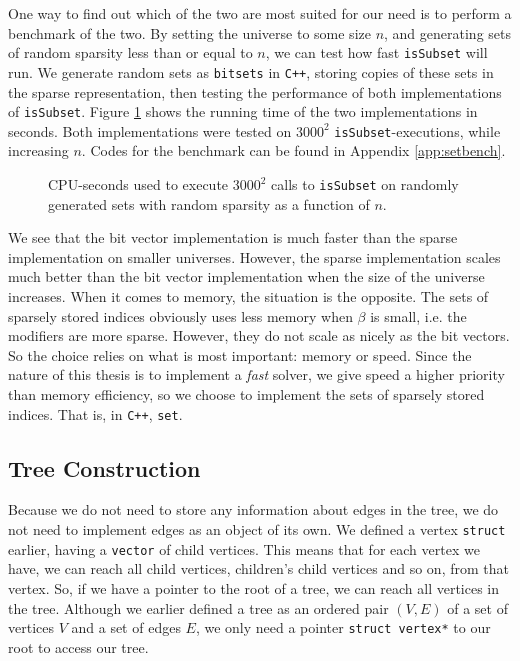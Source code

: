 One way to find out which of the two are most suited for our need is to perform
a benchmark of the two.
By setting the universe to some size $n$, and generating sets of
random sparsity less than or equal to $n$, we can test how fast
\texttt{isSubset} will run.
We generate random sets as \texttt{bitsets} in \texttt{C++}, storing copies
of these sets in the sparse representation, then testing the performance 
of both implementations of \texttt{isSubset}.
Figure \ref{fig:setspeed}
shows the running time of the two implementations in seconds. Both
implementations were tested on $3000^2$ \texttt{isSubset}-executions, while
increasing $n$.
Codes for the benchmark can be found in Appendix \ref{app:setbench}.
\begin{figure}[ht!]
\centering

\caption{CPU-seconds used to execute $3000^2$ calls to \texttt{isSubset} on
         randomly generated sets with random sparsity as a function of $n$.}
\label{fig:setspeed}
\end{figure}

We see that the bit vector implementation is much faster than the sparse
implementation on smaller universes. However, the sparse implementation
scales much better than the bit vector implementation when the size of
the universe increases. When it comes to memory, the situation is the opposite.
The sets of sparsely stored indices obviously uses less
memory when $\beta$ is small, i.e. the modifiers are more sparse. However, they
do not scale as nicely as the bit vectors. So the choice relies on what is
most important: memory or speed. Since the nature of this thesis is to
implement a \emph{fast} solver, we give speed a higher priority than memory 
efficiency, so we choose to implement the sets of sparsely stored
indices. That is, in \texttt{C++}, \texttt{set}.

\subsection{Tree Construction}
Because we do not need to store any information about edges in the tree,
we do not need to implement edges as an object of its own. We defined
a vertex \texttt{struct} earlier, having a \texttt{vector} of child
vertices. This means that for each vertex we have, we can reach all child
vertices, children's child vertices and so on, from that vertex.
So, if we have a pointer to the root of a tree, we can reach all vertices
in the tree. Although we earlier defined a tree as an ordered pair
$(V, E)$ of a set of vertices $V$ and a set of edges $E$, we only need a
pointer \texttt{struct vertex*} to our root to access our tree.

